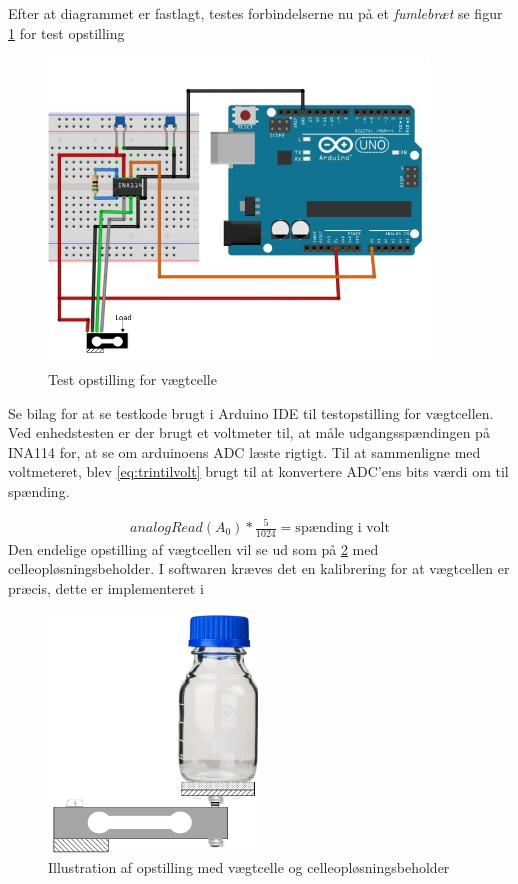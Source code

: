 Efter at diagrammet er fastlagt, testes forbindelserne nu på et \textit{fumlebræt} se figur \ref{fig:loadcelltest} for test opstilling
  \begin{figure}[H]
	\centering
	\includegraphics[width=0.9\textwidth]{billeder/Hardware/diagrammer/Drawing1.jpg}
	\caption{Test opstilling for vægtcelle}
	\label{fig:loadcelltest}
\end{figure}
 Se bilag for at se testkode brugt i Arduino IDE til testopstilling for vægtcellen. Ved enhedstesten er der brugt et voltmeter til, at måle udgangsspændingen på INA114 for, at se om arduinoens ADC læste rigtigt. Til at sammenligne med voltmeteret, blev \ref{eq:trintilvolt} brugt til at konvertere ADC'ens bits værdi om til spænding.
 
 \begin{align}
 analogRead(A_0)*\frac{5}{1024}=\text{spænding i volt}
 \label{eq:trintilvolt}
 \end{align}
Den endelige opstilling af vægtcellen vil se ud som på \ref{fig:loadcell_mont} med celleopløsningsbeholder. I softwaren kræves det en kalibrering for at vægtcellen er præcis, dette er implementeret i 
 
 \begin{figure}[H]
	\centering
	\includegraphics[width=0.5\textwidth]{billeder/Hardware/diagrammer/loadcell_montering.pdf}
	\caption{Illustration af opstilling med vægtcelle og celleopløsningsbeholder}
	\label{fig:loadcell_mont}
\end{figure}

